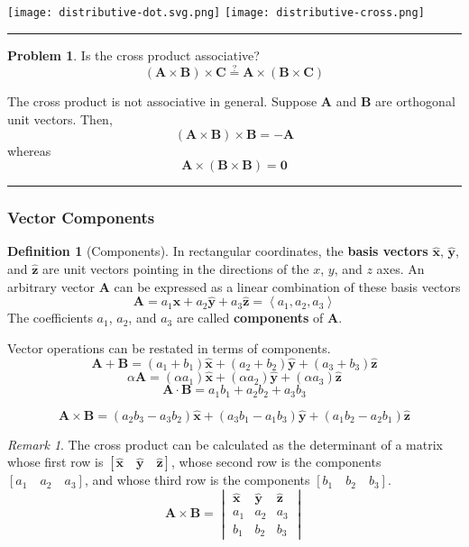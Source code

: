 \documentclass{article}
\theoremstyle{definition}
\newtheorem*{definition}{Definition}
\newtheorem{problem}{Problem}[section]
\theoremstyle{remark}
\newtheorem*{remark}{Remark}
\newcommand{\pline}{\par\noindent\rule{\textwidth}{0.5pt}}
\newcommand{\components}[1]{\left\langle #1 \right\rangle}
\renewcommand{\vec}{\mathbf}
\newcommand{\veca}{\vec{A}}
\newcommand{\vecb}{\vec{B}}
\newcommand{\vecc}{\vec{C}}
\newcommand{\xhat}{\hat{\vec{x}}}
\newcommand{\yhat}{\hat{\vec{y}}}
\newcommand{\zhat}{\hat{\vec{z}}}
\newcommand{\cross}{\times}
\begin{document}
\texttt{[image: distributive-dot.svg.png]}
\texttt{[image: distributive-cross.png]}
\pline
\begin{problem}
Is the cross product associative?
\[(\veca\cross\vecb)\cross\vecc\overset{?}{=}\veca\cross(\vecb\cross\vecc)\]
\end{problem}
The cross product is not associative in general. Suppose $\veca$ and $\vecb$ are orthogonal unit vectors. Then, 
\[(\veca\cross\vecb)\cross\vecb = -\veca\]
whereas
\[\veca\cross(\vecb\cross\vecb) = \vec{0}\]
\pline

\subsubsection{Vector Components}

\begin{definition}[Components]
In rectangular coordinates, the \textbf{basis vectors} $\xhat$, $\yhat$, and $\zhat$ are unit vectors pointing in the directions of the $x$, $y$, and $z$ axes. An arbitrary vector $\veca$ can be expressed as a linear combination of these basis vectors
\[\veca = a_{1}\xhat+a_{2}\yhat+a_{3}\zhat = \components{a_1,a_2,a_3}\]
The coefficients $a_{1}$, $a_{2}$, and $a_{3}$ are called \textbf{components} of $\veca$.
\end{definition}

\noindent Vector operations can be restated in terms of components.
\begin{equation}
\veca+\vecb = (a_{1}+b_{1})\xhat+(a_{2}+b_{2})\yhat+(a_{3}+b_{3})\zhat
\end{equation}
\begin{equation}
\alpha\veca = (\alpha a_{1})\xhat+(\alpha a_{2})\yhat+(\alpha a_{3})\zhat
\end{equation}
\begin{equation}
\veca\cdot\vecb=a_1b_1+a_2b_2+a_3b_3
\end{equation}
\addtocounter{equation}{2}
\begin{equation}
\veca\cross\vecb=(a_2b_3-a_3b_2)\xhat+(a_3b_1-a_1b_3)\yhat+(a_1b_2-a_2b_1)\zhat
\end{equation}
\begin{remark}
The cross product can be calculated as the determinant of a matrix whose first row is $[\xhat\quad\yhat\quad\zhat]$, whose second row is the components $[a_1 \quad a_2 \quad a_3]$, and whose third row is the components $[b_1 \quad b_2 \quad b_3]$.
\begin{equation}
\veca\cross\vecb = 
\begin{vmatrix}
\xhat & \yhat & \zhat \\
a_1 & a_2 & a_3 \\
b_1 & b_2 & b_3
\end{vmatrix}
\end{equation}
\end{remark}
\end{document}
